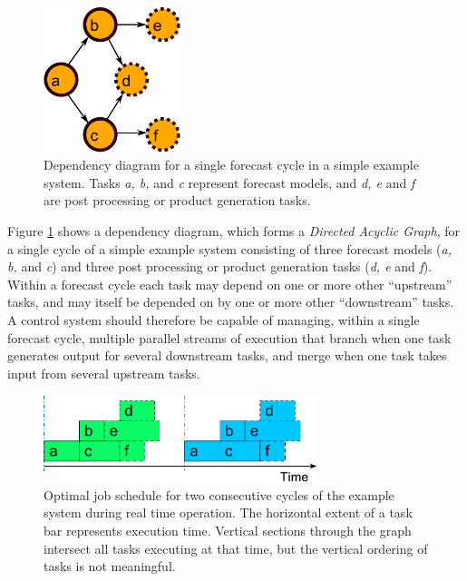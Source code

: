 \documentclass[11pt,a4paper]{article}
\begin{document}
\begin{figure} 
    \begin{center}
    \includegraphics[width=4cm]{dependencies-one} 
    \end{center}
    \caption{\small Dependency diagram for a single forecast cycle in a
    simple example system. Tasks {\em a, b,} and {\em c} represent
    forecast models, and {\em d, e} and {\em f} are post processing or
    product generation tasks.} 
    \label{fig-dep-one} 
\end{figure} 

Figure \ref{fig-dep-one} shows a dependency diagram, which forms a {\em
Directed Acyclic Graph}, for a single cycle of a simple example system
consisting of three forecast models ({\em a, b,} and {\em c}) and three
post processing or product generation tasks ({\em d, e} and {\em f}).
Within a forecast cycle each task may depend on one or more other
``upstream'' tasks, and may itself be depended on by one or more other
``downstream'' tasks.  A control system should therefore be capable of
managing, within a single forecast cycle, multiple parallel streams of
execution that branch when one task generates output for several
downstream tasks, and merge when one task takes input from several
upstream tasks. 

\begin{figure}
    \begin{center}
        \includegraphics[width=8cm]{timeline-one}
    \end{center}
    \caption{\small Optimal job schedule for two consecutive
cycles of the example system during real time operation. The horizontal
extent of a task bar represents execution time. Vertical sections
through the graph intersect all tasks executing at that time, but the
vertical ordering of tasks is not meaningful.}
    \label{fig-time-one}
\end{figure}
\end{document}
